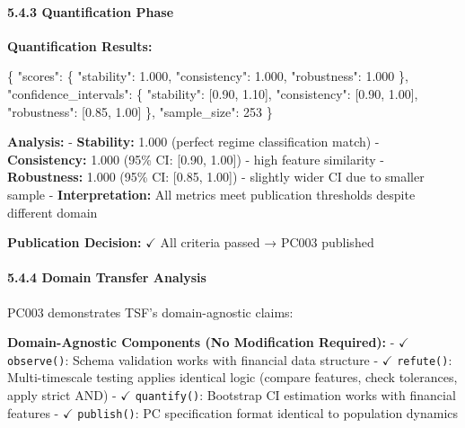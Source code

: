 \documentclass[
]{article}
\newenvironment{Shaded}{}{}
\newcommand{\DataTypeTok}[1]{\textcolor[rgb]{0.56,0.13,0.00}{#1}}
\newcommand{\DecValTok}[1]{\textcolor[rgb]{0.25,0.63,0.44}{#1}}
\newcommand{\FloatTok}[1]{\textcolor[rgb]{0.25,0.63,0.44}{#1}}
\newcommand{\FunctionTok}[1]{\textcolor[rgb]{0.02,0.16,0.49}{#1}}
\newcommand{\OtherTok}[1]{\textcolor[rgb]{0.00,0.44,0.13}{#1}}
\begin{document}
\paragraph{5.4.3 Quantification Phase}\label{quantification-phase-1}

\textbf{Quantification Results:}

\begin{Shaded}
\begin{Highlighting}[]
\FunctionTok{\{}
  \DataTypeTok{"scores"}\FunctionTok{:} \FunctionTok{\{}
    \DataTypeTok{"stability"}\FunctionTok{:} \FloatTok{1.000}\FunctionTok{,}
    \DataTypeTok{"consistency"}\FunctionTok{:} \FloatTok{1.000}\FunctionTok{,}
    \DataTypeTok{"robustness"}\FunctionTok{:} \FloatTok{1.000}
  \FunctionTok{\},}
  \DataTypeTok{"confidence\_intervals"}\FunctionTok{:} \FunctionTok{\{}
    \DataTypeTok{"stability"}\FunctionTok{:} \OtherTok{[}\FloatTok{0.90}\OtherTok{,} \FloatTok{1.10}\OtherTok{]}\FunctionTok{,}
    \DataTypeTok{"consistency"}\FunctionTok{:} \OtherTok{[}\FloatTok{0.90}\OtherTok{,} \FloatTok{1.00}\OtherTok{]}\FunctionTok{,}
    \DataTypeTok{"robustness"}\FunctionTok{:} \OtherTok{[}\FloatTok{0.85}\OtherTok{,} \FloatTok{1.00}\OtherTok{]}
  \FunctionTok{\},}
  \DataTypeTok{"sample\_size"}\FunctionTok{:} \DecValTok{253}
\FunctionTok{\}}
\end{Highlighting}
\end{Shaded}

\textbf{Analysis:} - \textbf{Stability:} 1.000 (perfect regime
classification match) - \textbf{Consistency:} 1.000 (95\% CI: {[}0.90,
1.00{]}) - high feature similarity - \textbf{Robustness:} 1.000 (95\%
CI: {[}0.85, 1.00{]}) - slightly wider CI due to smaller sample -
\textbf{Interpretation:} All metrics meet publication thresholds despite
different domain

\textbf{Publication Decision:} $\checkmark$ All criteria passed → PC003 published

\paragraph{5.4.4 Domain Transfer
Analysis}\label{domain-transfer-analysis}

PC003 demonstrates TSF's domain-agnostic claims:

\textbf{Domain-Agnostic Components (No Modification Required):} - $\checkmark$
\texttt{observe()}: Schema validation works with financial data
structure - $\checkmark$ \texttt{refute()}: Multi-timescale testing applies
identical logic (compare features, check tolerances, apply strict AND) -
$\checkmark$ \texttt{quantify()}: Bootstrap CI estimation works with financial
features - $\checkmark$ \texttt{publish()}: PC specification format identical to
population dynamics
\end{document}
